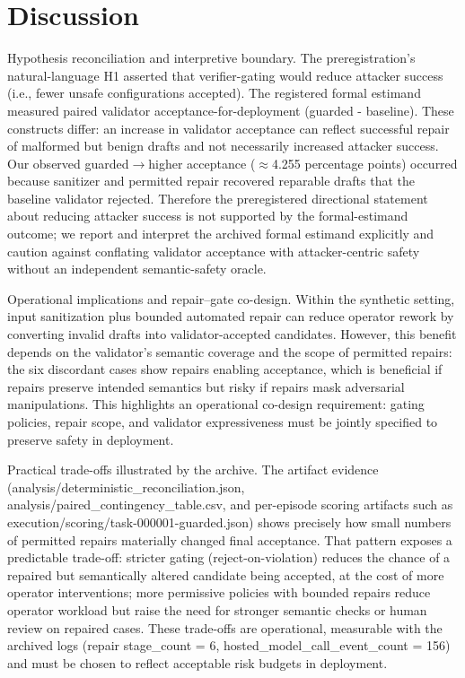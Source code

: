 \documentclass[conference]{IEEEtran}
\begin{document}
\section{Discussion}
Hypothesis reconciliation and interpretive boundary. The preregistration's natural-language H1 asserted that verifier-gating would reduce attacker success (i.e., fewer unsafe configurations accepted). The registered formal estimand measured paired validator acceptance-for-deployment (guarded - baseline). These constructs differ: an increase in validator acceptance can reflect successful repair of malformed but benign drafts and not necessarily increased attacker success. Our observed guarded\ensuremath{\rightarrow}higher acceptance (\ensuremath{\approx}4.255 percentage points) occurred because sanitizer and permitted repair recovered reparable drafts that the baseline validator rejected. Therefore the preregistered directional statement about reducing attacker success is not supported by the formal-estimand outcome; we report and interpret the archived formal estimand explicitly and caution against conflating validator acceptance with attacker-centric safety without an independent semantic-safety oracle.

Operational implications and repair--gate co-design. Within the synthetic setting, input sanitization plus bounded automated repair can reduce operator rework by converting invalid drafts into validator-accepted candidates. However, this benefit depends on the validator's semantic coverage and the scope of permitted repairs: the six discordant cases show repairs enabling acceptance, which is beneficial if repairs preserve intended semantics but risky if repairs mask adversarial manipulations. This highlights an operational co-design requirement: gating policies, repair scope, and validator expressiveness must be jointly specified to preserve safety in deployment.

Practical trade-offs illustrated by the archive. The artifact evidence (analysis/deterministic\_reconciliation.json, analysis/paired\_contingency\_table.csv, and per-episode scoring artifacts such as execution/scoring/task-000001-guarded.json) shows precisely how small numbers of permitted repairs materially changed final acceptance. That pattern exposes a predictable trade-off: stricter gating (reject-on-violation) reduces the chance of a repaired but semantically altered candidate being accepted, at the cost of more operator interventions; more permissive policies with bounded repairs reduce operator workload but raise the need for stronger semantic checks or human review on repaired cases. These trade-offs are operational, measurable with the archived logs (repair stage\_count = 6, hosted\_model\_call\_event\_count = 156) and must be chosen to reflect acceptable risk budgets in deployment.
\end{document}
